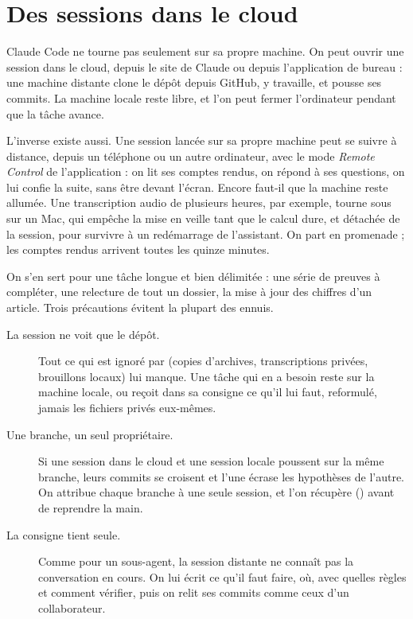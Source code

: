 \section{Des sessions dans le cloud}

Claude Code ne tourne pas seulement sur sa propre machine. On peut ouvrir une session dans
le cloud, depuis le site de Claude ou depuis l'application de bureau : une machine
distante clone le dépôt depuis GitHub, y travaille, et pousse ses commits. La machine
locale reste libre, et l'on peut fermer l'ordinateur pendant que la tâche avance.

L'inverse existe aussi. Une session lancée sur sa propre machine peut se suivre à distance, depuis un téléphone ou un autre ordinateur, avec le mode \emph{Remote Control} de l'application : on lit ses comptes rendus, on répond à ses questions, on lui confie la suite, sans être devant l'écran. Encore faut-il que la machine reste allumée. Une transcription audio de plusieurs heures, par exemple, tourne sous  sur un Mac, qui empêche la mise en veille tant que le calcul dure, et détachée de la session, pour survivre à un redémarrage de l'assistant. On part en promenade ; les comptes rendus arrivent toutes les quinze minutes.

On s'en sert pour une tâche longue et bien délimitée : une série de preuves à
compléter, une relecture de tout un dossier, la mise à jour des chiffres d'un article. Trois
précautions évitent la plupart des ennuis.

\begin{description}
  \item[La session ne voit que le dépôt.] Tout ce qui est ignoré par 
        (copies d'archives, transcriptions privées, brouillons locaux) lui manque. Une
        tâche qui en a besoin reste sur la machine locale, ou reçoit dans sa consigne ce
        qu'il lui faut, reformulé, jamais les fichiers privés eux-mêmes.
  \item[Une branche, un seul propriétaire.] Si une session dans le cloud et une session
        locale poussent sur la même branche, leurs commits se croisent et l'une écrase
        les hypothèses de l'autre. On attribue chaque branche à une seule session, et
        l'on récupère () avant de reprendre la main.
  \item[La consigne tient seule.] Comme pour un sous-agent, la session distante ne
        connaît pas la conversation en cours. On lui écrit ce qu'il faut faire, où, avec
        quelles règles et comment vérifier, puis on relit ses commits comme ceux d'un
        collaborateur.
\end{description}

